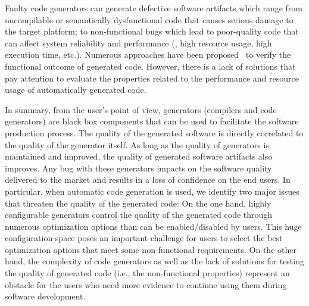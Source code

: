 Faulty code generators can generate defective software artifacts which range from uncompilable or semantically dysfunctional code that causes serious damage to the target platform; to non-functional bugs which lead to poor-quality code that can affect system reliability and performance (\eg, high resource usage, high execution time, etc.).
Numerous approaches have been proposed~\cite{stuermer2007systematic,yang2011finding} to verify the functional outcome of generated code. However, there is a lack of solutions that pay attention to evaluate the properties related to the performance and resource usage of automatically generated code. 



In summary, from the user's point of view, generators (compilers and code generators) are black box components that can be used to facilitate the software production process. The quality of the generated software is directly correlated to the quality of the generator itself. As long as the quality of generators is maintained and improved, the quality of generated software artifacts also improves. Any bug with these generators impacts on the software quality delivered to the market and results in a loss of confidence on the end users.
In particular, when automatic code generation is used, we identify two major issues that threaten the quality of the generated code:
On the one hand, highly configurable generators control the quality of the generated code through numerous optimization options than can be enabled/disabled by users. This huge configuration space poses an important challenge for users to select the best optimization options that meet some non-functional requirements.
On the other hand, the complexity of code generators as well as the lack of solutions for testing the quality of generated code (i.e., the non-functional properties) represent an obstacle for the users who need more evidence to continue using them during software development.



